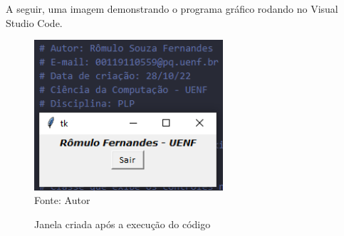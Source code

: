 	A seguir, uma imagem demonstrando o programa gráfico rodando no Visual Studio Code.
	
	\begin{figure}[H]
		\begin{center}
			\caption{Janela criada após a execução do código} \label{ling1}
			\includegraphics[width=7cm]{grafico.PNG} \\
			{\tiny \sf Fonte:{ Autor}}
		\end{center}
	\end{figure}

